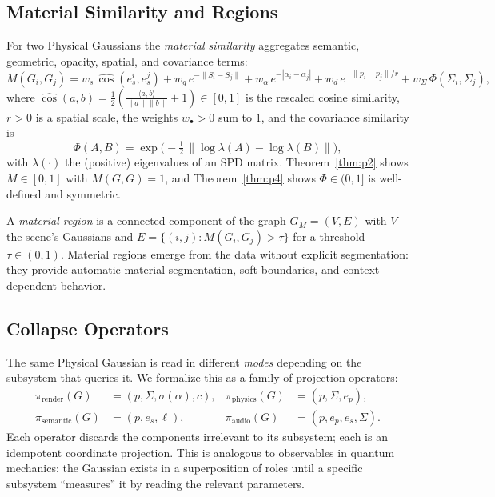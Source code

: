 \documentclass[twoside,11pt]{article}
\begin{document}
\subsection{Material Similarity and Regions}

For two Physical Gaussians the \emph{material similarity} aggregates semantic, geometric, opacity, spatial, and covariance terms:
\begin{equation}
\label{eq:similarity}
M(G_i, G_j) = w_s\,\widehat{\cos}(e_s^i, e_s^j)
  + w_g\,e^{-\|S_i - S_j\|}
  + w_\alpha\,e^{-|\alpha_i - \alpha_j|}
  + w_d\,e^{-\|p_i - p_j\|/r}
  + w_\Sigma\,\Phi(\Sigma_i, \Sigma_j),
\end{equation}
where $\widehat{\cos}(a,b) = \tfrac{1}{2}\!\left(\tfrac{\langle a,b\rangle}{\|a\|\|b\|} + 1\right) \in [0,1]$ is the rescaled cosine similarity, $r > 0$ is a spatial scale, the weights $w_\bullet > 0$ sum to $1$, and the covariance similarity is
\begin{equation}
\label{eq:covsim}
\Phi(A, B) = \exp\!\Big(-\tfrac{1}{2}\,\big\|\log \lambda(A) - \log \lambda(B)\big\|\Big),
\end{equation}
with $\lambda(\cdot)$ the (positive) eigenvalues of an SPD matrix. Theorem~\ref{thm:p2} shows $M \in [0,1]$ with $M(G,G) = 1$, and Theorem~\ref{thm:p4} shows $\Phi \in (0,1]$ is well-defined and symmetric.

A \emph{material region} is a connected component of the graph $G_M = (V, E)$ with $V$ the scene's Gaussians and $E = \{(i,j) : M(G_i, G_j) > \tau\}$ for a threshold $\tau \in (0,1)$. Material regions emerge from the data without explicit segmentation: they provide automatic material segmentation, soft boundaries, and context-dependent behavior.

\subsection{Collapse Operators}

The same Physical Gaussian is read in different \emph{modes} depending on the subsystem that queries it. We formalize this as a family of projection operators:
\begin{align}
\pi_{\text{render}}(G)  &= (p, \Sigma, \sigma(\alpha), c), &
\pi_{\text{physics}}(G) &= (p, \Sigma, e_p), \\
\pi_{\text{semantic}}(G) &= (p, e_s, \ell), &
\pi_{\text{audio}}(G)   &= (p, e_p, e_s, \Sigma).
\end{align}
Each operator discards the components irrelevant to its subsystem; each is an idempotent coordinate projection. This is analogous to observables in quantum mechanics: the Gaussian exists in a superposition of roles until a specific subsystem ``measures'' it by reading the relevant parameters.
\end{document}
